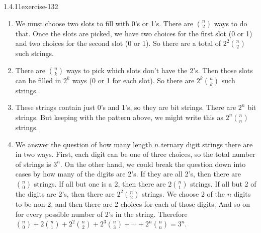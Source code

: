 \documentclass[twoside,11pt,]{book}
\numberwithin{equation}{chapter}
\begin{document}
\begin{divisionsolution}{1.4.11}{}{exercise-132}
\begin{enumerate}[label=(\alph*)]
\item\hypertarget{li-1349}{}\hypertarget{p-2156}{}%
We must choose two slots to fill with 0's or 1's. There are \({n \choose 2}\) ways to do that. Once the slots are picked, we have two choices for the first slot (0 or 1) and two choices for the second slot (0 or 1). So there are a total of \(2^2{n \choose 2}\) such strings.%
\item\hypertarget{li-1350}{}\hypertarget{p-2157}{}%
There are \({n \choose k}\) ways to pick which slots don't have the 2's. Then those slots can be filled in \(2^k\) ways (0 or 1 for each slot). So there are \(2^k{n \choose k}\) such strings.%
\item\hypertarget{li-1351}{}\hypertarget{p-2158}{}%
These strings contain just 0's and 1's, so they are bit strings. There are \(2^n\) bit strings. But keeping with the pattern above, we might write this as \(2^n {n \choose n}\) strings.%
\item\hypertarget{li-1352}{}\hypertarget{p-2159}{}%
We answer the question of how many length \(n\) ternary digit strings there are in two ways. First, each digit can be one of three choices, so the total number of strings is \(3^n\). On the other hand, we could break the question down into cases by how many of the digits are 2's. If they are all 2's, then there are \({n \choose 0}\) strings. If all but one is a 2, then there are \(2{n \choose 1}\) strings. If all but 2 of the digits are 2's, then there are \(2^2{n \choose 2}\) strings. We choose 2 of the \(n\) digits to be non-2, and then there are 2 choices for each of those digits. And so on for every possible number of 2's in the string. Therefore \({n \choose 0} + 2{n \choose 1} + 2^2{n \choose 2} + 2^3{n \choose 3} + \cdots + 2^n{n \choose n} = 3^n\).%
\end{enumerate}
%
\end{divisionsolution}%
\end{document}
